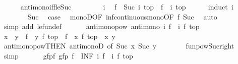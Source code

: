 \begin{isabellebody}
\ \ \ \ \isamarkupfalse%
\ antimono{\isacharunderscore}iff{\isacharunderscore}le{\isacharunderscore}Suc\isanewline
\ \ \isamarkupfalse%
\isanewline
\ \ \ \ \isamarkupfalse%
\ i\ \isamarkupfalse%
\ {\isachardoublequoteopen}{\isacharparenleft}f\ {\isacharcircum}{\isacharcircum}\ Suc\ i{\isacharparenright}\ top\ {\isasymle}\ {\isacharparenleft}f\ {\isacharcircum}{\isacharcircum}\ i{\isacharparenright}\ top{\isachardoublequoteclose}\isanewline
\ \ \ \ \isamarkupfalse%
\ {\isacharparenleft}induct\ i{\isacharparenright}\isanewline
\ \ \ \ \ \ \isamarkupfalse%
\ Suc\ \isamarkupfalse%
\ {\isacharquery}case\ \isamarkupfalse%
\ monoD{\isacharbrackleft}OF\ inf{\isacharunderscore}continuous{\isacharunderscore}mono{\isacharbrackleft}OF\ f{\isacharbrackright}\ Suc{\isacharbrackright}\ \isamarkupfalse%
\ auto\isanewline
\ \ \ \ \isamarkupfalse%
\ {\isacharparenleft}simp\ add{\isacharcolon}\ le{\isacharunderscore}fun{\isacharunderscore}def{\isacharparenright}\isanewline
\ \ \isamarkupfalse%
\isanewline
\ \ \isamarkupfalse%
\ antimono{\isacharunderscore}pow{}{\isacharcolon}\ {\isachardoublequoteopen}antimono\ {\isacharparenleft}{\isasymlambda}i{\isachardot}\ {\isacharparenleft}f\ {\isacharcircum}{\isacharcircum}\ i{\isacharparenright}\ {\isacharparenleft}f\ top{\isacharparenright}{\isacharparenright}{\isachardoublequoteclose}\isanewline
\ \ \isamarkupfalse%
\isanewline
\ \ \ \ \isamarkupfalse%
\ {\isachardoublequoteopen}x\ {\isasymle}\ y\ {\isasymLongrightarrow}\ {\isacharparenleft}f\ {\isacharcircum}{\isacharcircum}\ y{\isacharparenright}\ {\isacharparenleft}f\ top{\isacharparenright}\ {\isasymle}\ {\isacharparenleft}f\ {\isacharcircum}{\isacharcircum}\ x{\isacharparenright}\ {\isacharparenleft}f\ top{\isacharparenright}{\isachardoublequoteclose}\ \ x\ y\isanewline
\ \ \ \ \ \ \isamarkupfalse%
\ antimono{\isacharunderscore}pow{\isacharbrackleft}THEN\ antimonoD{\isacharcomma}\ of\ {\isachardoublequoteopen}Suc\ x{\isachardoublequoteclose}\ {\isachardoublequoteopen}Suc\ y{\isachardoublequoteclose}{\isacharbrackright}\isanewline
\ \ \ \ \ \ \isamarkupfalse%
\ funpow{\isacharunderscore}Suc{\isacharunderscore}right\ \isamarkupfalse%
\ simp\isanewline
\ \ \isamarkupfalse%
\isanewline
\isanewline
\ \ \isamarkupfalse%
\ gfp{\isacharunderscore}f{\isacharcolon}\ {\isachardoublequoteopen}gfp\ f\ {\isacharequal}\ {\isacharparenleft}INF\ i{\isachardot}\ {\isacharparenleft}f\ {\isacharcircum}{\isacharcircum}\ i{\isacharparenright}\ {\isacharparenleft}f\ top{\isacharparenright}{\isacharparenright}{\isachardoublequoteclose}\isanewline

\end{isabellebody}
